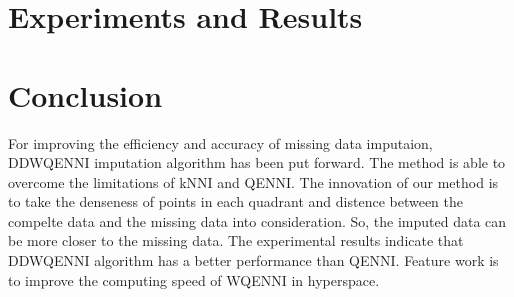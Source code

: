 \documentclass[print]{jicspack}
\begin{document}
\section{Experiments and Results}
\label{Maintext}

\section{Conclusion}
\label{Maintext}

For improving the efficiency and accuracy of missing data imputaion, DDWQENNI imputation algorithm has been put forward. The method is able to overcome the limitations of kNNI and QENNI. The innovation of our method is to take the denseness of points in each quadrant and distence between the compelte data and the missing data into consideration. So, the imputed data can be more closer to the missing data. The experimental results indicate that DDWQENNI algorithm has a better performance than QENNI. Feature work is to improve the computing speed of WQENNI in hyperspace.
\end{document}
